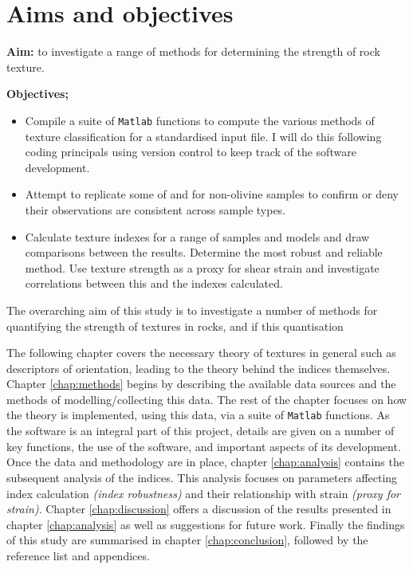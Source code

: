\documentclass[a4paper,12pt]{report}
\numberwithin{equation}{chapter}
\begin{document}
\section{Aims and objectives} \label{sec:aims+objs}
\noindent
\textbf{Aim:} to investigate a range of methods for determining the strength of rock texture.

\noindent	 
\textbf{Objectives;}
	\begin{itemize}
		\item Compile a suite of \texttt{Matlab} functions to compute the various methods of texture classification for a standardised input file. I will do this following coding principals \citep{Computing} using version control to keep track of the software development.
		\item Attempt to replicate some of \cite{Skemer} and \cite{Mainprice} for non-olivine samples to confirm or deny their observations are consistent across sample types.
		\item Calculate texture indexes for a range of samples and models and draw comparisons between the results. Determine the most robust and reliable method. Use texture strength as a proxy for shear strain and investigate correlations between this and the indexes calculated.
	\end{itemize}
	
	
The overarching aim of this study is to investigate a number of methods for quantifying the strength of textures in rocks, and if this quantisation 

The following chapter covers the necessary theory of textures in general such as descriptors of orientation, leading to the theory behind the indices themselves. Chapter \ref{chap:methods} begins by describing the available data sources and the methods of modelling/collecting this data. The rest of the chapter focuses on how the theory is implemented, using this data, via a suite of \texttt{Matlab} functions. As the software is an integral part of this project, details are given on a number of key functions, the use of the software, and important aspects of its development. Once the data and methodology are in place, chapter \ref{chap:analysis} contains the subsequent analysis of the indices. This analysis focuses on parameters affecting index calculation \emph{(index robustness)} and their relationship with strain \emph{(proxy for strain)}. Chapter \ref{chap:discussion} offers a discussion of the results presented in chapter \ref{chap:analysis} as well as suggestions for future work. Finally the findings of this study are summarised in chapter \ref{chap:conclusion}, followed by the reference list and appendices.   
\end{document}
